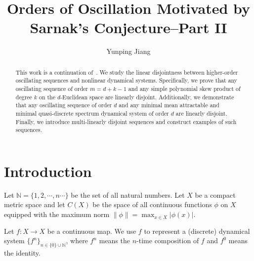 \documentclass[12pt,letterpaper]{amsart}
\newcommand {\N} {{\mathbb N}}
\begin{document}
\title[Order of Oscillations]{Orders of Oscillation Motivated by Sarnak's Conjecture--Part II}
 
\author{Yunping Jiang}
\address[]{Department of Mathematics\\
 Queens College of the City University of New York\\
 Flushing, NY 11367-1597\\
 and\\
 The Ph.D. Program in Mathematics\\
 Graduate Center of the City University of New York;
 New York, NY 10016}
 
 

\begin{abstract}
 This work is a continuation of~\cite{JPAMS}. We study the linear disjointness between higher-order oscillating sequences and nonlinear dynamical systems. Specifically, we prove that any oscillating sequence of order $m=d+k-1$ and any simple polynomial skew product of degree $k$ on the $d$-Euclidean space are linearly disjoint. Additionally, we demonstrate that any oscillating sequence of order $d$ and any minimal mean attractable and minimal quasi-discrete spectrum dynamical system of order $d$ are linearly disjoint. Finally, we introduce multi-linearly disjoint sequences and construct examples of such sequences.
\end{abstract}

\maketitle




\section{Introduction}

Let $\N=\{ 1, 2, \cdots, n\cdots \}$ be the set of all natural numbers. Let $X$ be a compact metric space and let $C(X)$ be the space of all continuous functions $\phi$ on $X$ equipped with the maximum norm $\|\phi \|=\max_{x\in X} |\phi (x)|$. 

Let $f: X\to X$ be a continuous map. We use $f$ to represent a (discrete) dynamical system $\{f^{n}\}_{n\in \{0\}\cup\N}$, where $f^{n}$ means the $n$-time composition of $f$ and $f^{0}$ means the identity. 
\end{document}
